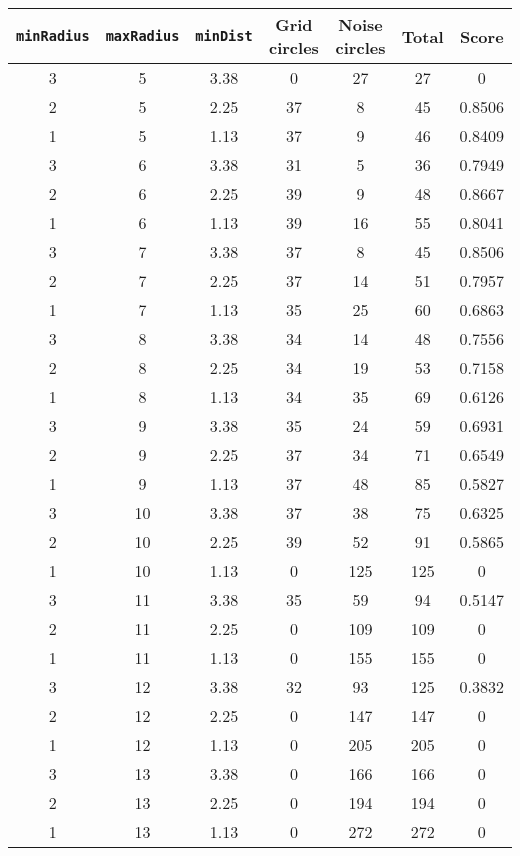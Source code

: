 \documentclass[letterpaper, 12pt]{article}
\begin{document}
\begin{longtable}{|c|c|c|c|c|c|c|}
\hline
\textbf{\texttt{minRadius}} & \textbf{\texttt{maxRadius}} & \textbf{\texttt{minDist}} & \textbf{Grid circles} & \textbf{Noise circles} & \textbf{Total} & \textbf{Score} \\
\hline
3 & 5 & 3.38 & 0 & 27 & 27 & 0 \\
\hline
2 & 5 & 2.25 & 37 & 8 & 45 & 0.8506 \\
\hline
1 & 5 & 1.13 & 37 & 9 & 46 & 0.8409 \\
\hline
3 & 6 & 3.38 & 31 & 5 & 36 & 0.7949 \\
\hline
2 & 6 & 2.25 & 39 & 9 & 48 & 0.8667 \\
\hline
1 & 6 & 1.13 & 39 & 16 & 55 & 0.8041 \\
\hline
3 & 7 & 3.38 & 37 & 8 & 45 & 0.8506 \\
\hline
2 & 7 & 2.25 & 37 & 14 & 51 & 0.7957 \\
\hline
1 & 7 & 1.13 & 35 & 25 & 60 & 0.6863 \\
\hline
3 & 8 & 3.38 & 34 & 14 & 48 & 0.7556 \\
\hline
2 & 8 & 2.25 & 34 & 19 & 53 & 0.7158 \\
\hline
1 & 8 & 1.13 & 34 & 35 & 69 & 0.6126 \\
\hline
3 & 9 & 3.38 & 35 & 24 & 59 & 0.6931 \\
\hline
2 & 9 & 2.25 & 37 & 34 & 71 & 0.6549 \\
\hline
1 & 9 & 1.13 & 37 & 48 & 85 & 0.5827 \\
\hline
3 & 10 & 3.38 & 37 & 38 & 75 & 0.6325 \\
\hline
2 & 10 & 2.25 & 39 & 52 & 91 & 0.5865 \\
\hline
1 & 10 & 1.13 & 0 & 125 & 125 & 0 \\
\hline
3 & 11 & 3.38 & 35 & 59 & 94 & 0.5147 \\
\hline
2 & 11 & 2.25 & 0 & 109 & 109 & 0 \\
\hline
1 & 11 & 1.13 & 0 & 155 & 155 & 0 \\
\hline
3 & 12 & 3.38 & 32 & 93 & 125 & 0.3832 \\
\hline
2 & 12 & 2.25 & 0 & 147 & 147 & 0 \\
\hline
1 & 12 & 1.13 & 0 & 205 & 205 & 0 \\
\hline
3 & 13 & 3.38 & 0 & 166 & 166 & 0 \\
\hline
2 & 13 & 2.25 & 0 & 194 & 194 & 0 \\
\hline
1 & 13 & 1.13 & 0 & 272 & 272 & 0 \\

\end{longtable}
\end{document}
